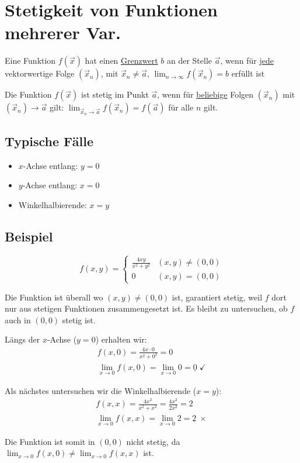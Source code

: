 \section{Stetigkeit von Funktionen mehrerer Var.}
\begin{definition}[Grenzwert]
Eine Funktion $f(\vec{x})$ hat einen \underline{Grenzwert} $b$ an der Stelle
$\vec{a}$, wenn für \underline{jede} vektorwertige Folge $(\vec{x}_n)$,
mit $\vec{x}_n \neq \vec{a}$, $\lim_{n \to \infty}f(\vec{x}_n) = b$ erfüllt ist
\end{definition}
\begin{definition}[Stetigkeit]
Die Funktion $f(\vec{x})$ ist stetig im Punkt $\vec{a}$, wenn für
\underline{beliebige} Folgen $(\vec{x}_n)$ mit
$(\vec{x}_n) \to \vec{a}$ gilt: $\lim_{\vec{x}_n \to \vec{a}} f(\vec{x}_n) = f(\vec{a})$
für alle $n$ gilt.
\end{definition}

\subsection{Typische Fälle}
\begin{itemize}
	\item $x$-Achse entlang: $y = 0$
	\item $y$-Achse entlang: $x = 0$
	\item Winkelhalbierende: $x = y$
\end{itemize}

\subsection*{Beispiel}
\[
f(x, y) = \begin{cases}
	\frac{4xy}{x^2 + y^2} & (x,y) \neq (0,0)\\
	0 & (x,y) = (0,0)
\end{cases}
\]

Die Funktion ist überall wo $(x, y) \neq (0,0)$ ist, garantiert stetig, weil $f$ dort nur aus stetigen Funktionen zusammengesetzt ist. Es bleibt zu untersuchen, ob $f$ auch in $(0,0)$ stetig ist.

Längs der $x$-Achse ($y = 0$) erhalten wir:
\begin{align*}
f(x, 0) = \frac{4x \cdot 0}{x^2 + 0^2} = 0\\
\lim_{x \to 0} f(x, 0) = \lim_{x \to 0} 0 = \underline{0} \; \checkmark
\end{align*}

Als nächstes untersuchen wir die Winkelhalbierende ($x = y$):
\begin{align*}
f(x, x) = \frac{4x^2}{x^2 + x^2} = \frac{4x^2}{2x^2} = 2\\
\lim_{x \to 0} f(x, x) = \lim_{x \to 0} 2 = \underline{2} \; \times
\end{align*}

Die Funktion ist somit in $(0,0)$ nicht stetig, da
$\lim_{x \to 0} f(x, 0) \neq \lim_{x \to 0} f(x, x)$ ist.

